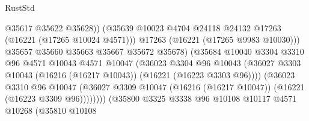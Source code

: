 \begin{lexlean}{RustStd}
\begin{coremodule}
                                            @35617
                                            @35622
                                            @35628))
                                        (@35639
                                          @10023
                                          @4704
                                          @24118
                                          @24132
                                          @17263
                                          (@16221 (@17265 @10024 @4571)))
                                        @17263
                                        (@16221 (@17265 @9983 @10030)))
                                      @35657
                                      @35660
                                      @35663
                                      @35667
                                      @35672
                                      @35678)
                                    (@35684
                                      @10040
                                      @3304
                                      @3310
                                      @96
                                      @4571
                                      @10043
                                      @4571
                                      @10047
                                      (@36023
                                        @3304
                                        @96
                                        @10043
                                        (@36027
                                          @3303
                                          @10043
                                          (@16216 (@16217 @10043))
                                          (@16221 (@16223 @3303 @96))))
                                      (@36023
                                        @3310
                                        @96
                                        @10047
                                        (@36027
                                          @3309
                                          @10047
                                          (@16216 (@16217 @10047))
                                          (@16221 (@16223 @3309 @96))))))))
                              (@35800
                                @3325
                                @3338
                                @96
                                @10108
                                @10117
                                @4571
                                @10268
                                (@35810
                                  @10108

\end{coremodule}
\end{lexlean}
